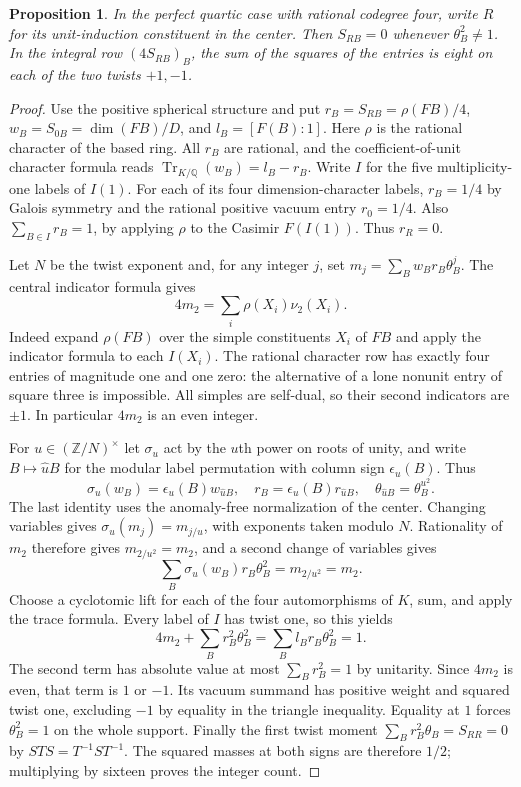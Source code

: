 \documentclass[11pt,a4paper]{article}
\newtheorem{proposition}[theorem]{Proposition}
\numberwithin{equation}{section}
\begin{document}
\begin{proposition}\label{prop:quartic-two-support}
In the perfect quartic case with rational codegree four, write $R$ for
its unit-induction constituent in the center. Then $S_{RB}=0$ whenever
$\theta_B^2\ne1$. In the integral row $(4S_{RB})_B$, the sum of the
squares of the entries is eight on each of the two twists $+1,-1$.
\end{proposition}
\begin{proof}
Use the positive spherical structure and put $r_B=S_{RB}=\rho(FB)/4$,
$w_B=S_{0B}=\dim(FB)/D$, and $l_B=[F(B):1]$.
Here $\rho$ is the rational character of the based ring. All $r_B$ are
rational, and the coefficient-of-unit character formula reads
$\operatorname{Tr}_{K/\mathbb Q}(w_B)=l_B-r_B$.
Write $I$ for the five multiplicity-one labels of $I(1)$.
For each of its four dimension-character labels, $r_B=1/4$ by
Galois symmetry and the rational positive vacuum entry $r_0=1/4$.
Also $\sum_{B\in I}r_B=1$, by applying $\rho$ to the Casimir
$F(I(1))$. Thus $r_R=0$.

Let $N$ be the twist exponent and, for any integer $j$, set
$m_j=\sum_B w_B r_B\theta_B^j$. The central indicator formula gives
\[
 4m_2=\sum_i\rho(X_i)\nu_2(X_i) .
\]
Indeed expand $\rho(FB)$ over the simple constituents $X_i$ of $FB$
and apply the indicator formula to each $I(X_i)$.
The rational character row has exactly four entries of magnitude one
and one zero: the alternative of a lone nonunit entry of square three
is impossible. All simples are self-dual, so their second indicators
are $\pm1$. In particular $4m_2$ is an even integer.

For $u\in(\mathbb Z/N)^\times$ let $\sigma_u$ act by the $u$th
power on roots of unity, and write $B\mapsto\widehat u B$ for the
modular label permutation with column sign $\epsilon_u(B)$. Thus
\[
 \sigma_u(w_B)=\epsilon_u(B)w_{\widehat uB},\quad
 r_B=\epsilon_u(B)r_{\widehat uB},\quad
 \theta_{\widehat uB}=\theta_B^{u^2}.
\]
The last identity uses the anomaly-free normalization of the center.
Changing variables gives $\sigma_u(m_j)=m_{j/u}$, with exponents
taken modulo $N$. Rationality of $m_2$ therefore gives
$m_{2/u^2}=m_2$, and a second change of variables gives
\[
 \sum_B\sigma_u(w_B)r_B\theta_B^2=m_{2/u^2}=m_2.
\]
Choose a cyclotomic lift for each of the four automorphisms of $K$,
sum, and apply the trace formula. Every label of $I$ has twist one,
so this yields
\[
 4m_2+\sum_B r_B^2\theta_B^2
 =\sum_B l_B r_B\theta_B^2=1 .
\]
The second term has absolute value at most $\sum_B r_B^2=1$ by
unitarity. Since $4m_2$ is even, that term is $1$ or $-1$.
Its vacuum summand has positive weight and squared twist one, excluding
$-1$ by equality in the triangle inequality. Equality at $1$ forces
$\theta_B^2=1$ on the whole support. Finally the first twist moment
$\sum_B r_B^2\theta_B=S_{RR}=0$ by $STS=T^{-1}ST^{-1}$.
The squared masses at both signs are therefore $1/2$; multiplying by
sixteen proves the integer count.
\end{proof}
\end{document}
